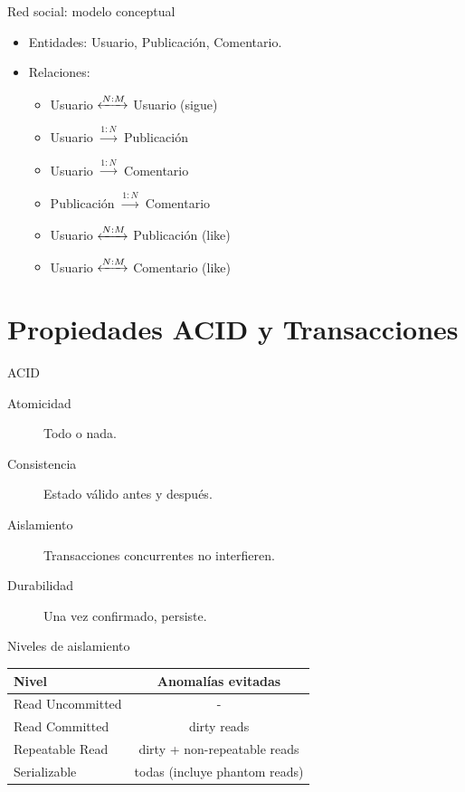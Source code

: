 \documentclass[aspectratio=169, 10pt, xcolor=table]{beamer}
\begin{document}
\begin{frame}{Red social: modelo conceptual}
    \begin{itemize}
        \item Entidades: Usuario, Publicación, Comentario.
        \item Relaciones:
        \begin{itemize}
            \item Usuario $\xleftrightarrow{N:M}$ Usuario (sigue)
            \item Usuario $\xrightarrow{1:N}$ Publicación
            \item Usuario $\xrightarrow{1:N}$ Comentario
            \item Publicación $\xrightarrow{1:N}$ Comentario
            \item Usuario $\xleftrightarrow{N:M}$ Publicación (like)
            \item Usuario $\xleftrightarrow{N:M}$ Comentario (like)
        \end{itemize}
    \end{itemize}
\end{frame}

\section{Propiedades ACID y Transacciones}

\begin{frame}{ACID}
    \begin{description}
        \item[Atomicidad] Todo o nada.
        \item[Consistencia] Estado válido antes y después.
        \item[Aislamiento] Transacciones concurrentes no interfieren.
        \item[Durabilidad] Una vez confirmado, persiste.
    \end{description}
\end{frame}

\begin{frame}{Niveles de aislamiento}
    \begin{table}
        \centering
        \begin{tabular}{l|c}
            \toprule
            Nivel & Anomalías evitadas \\
            \midrule
            Read Uncommitted & - \\
            Read Committed & dirty reads \\
            Repeatable Read & dirty + non-repeatable reads \\
            Serializable & todas (incluye phantom reads) \\
            \bottomrule
        \end{tabular}
    \end{table}
\end{frame}
\end{document}
